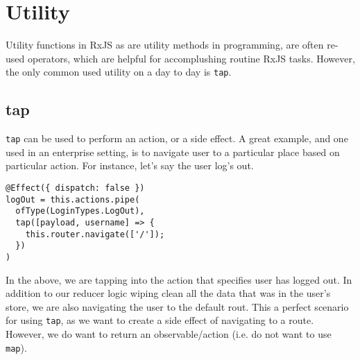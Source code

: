 \chapter{Utility}
Utility functions in RxJS as are utility methods in programming, are often 
re-used operators, which are helpful for accomplushing routine RxJS tasks. 
However, the only common used utility on a day to day is \lstinline{tap}.

\section{tap}
\lstinline{tap} can be used to perform an action, or a side effect. A great
example, and one used in an enterprise setting, is to navigate user to a 
particular place based on particular action. For instance, let's say the 
user log's out. 

\begin{lstlisting}[caption=login.effects.ts]
@Effect({ dispatch: false })
logOut = this.actions.pipe(
  ofType(LoginTypes.LogOut),
  tap([payload, username] => {
    this.router.navigate(['/']);
  })
)  
\end{lstlisting}

In the above, we are tapping into the action that specifies user has logged 
out. In addition to our reducer logic wiping clean all the data that was in the
user's store, we are also navigating the user to the default rout. This a 
perfect scenario for using \lstinline{tap}, as we want to create a side effect
of navigating to a route. However, we do want to return an observable/action
(i.e. do not want to use \lstinline{map}).  
